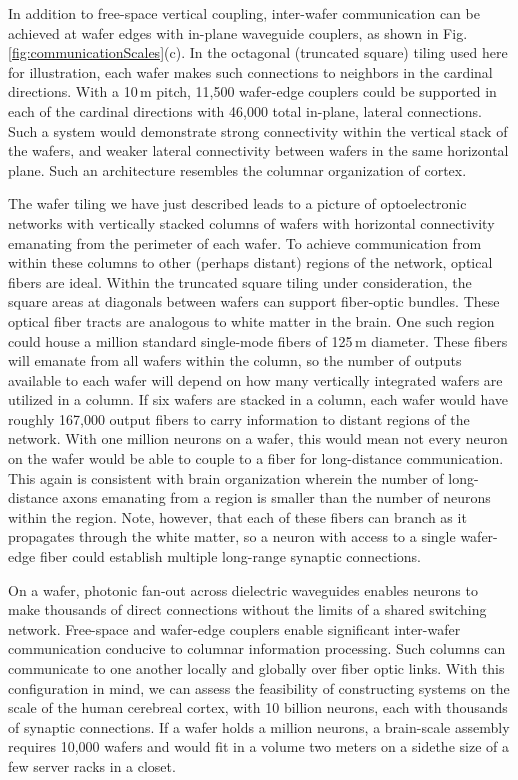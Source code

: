 \documentclass[twocolumn]{article}
\begin{document}
In addition to free-space vertical coupling, inter-wafer communication can be achieved at wafer edges with in-plane waveguide couplers, as shown in Fig.\,\ref{fig:communicationScales}(c). In the octagonal (truncated square) tiling used here for illustration, each wafer makes such connections to neighbors in the cardinal directions. With a 10\,\textmu m pitch, 11,500 wafer-edge couplers could be supported in each of the cardinal directions with 46,000 total in-plane, lateral connections. Such a system would demonstrate strong connectivity within the vertical stack of the wafers, and weaker lateral connectivity between wafers in the same horizontal plane. Such an architecture resembles the columnar organization of cortex.  

The wafer tiling we have just described leads to a picture of optoelectronic networks with vertically stacked columns of wafers with horizontal connectivity emanating from the perimeter of each wafer. To achieve communication from within these columns to other (perhaps distant) regions of the network, optical fibers are ideal. Within the truncated square tiling under consideration, the square areas at diagonals between wafers can support fiber-optic bundles. These optical fiber tracts are analogous to white matter in the brain. One such region could house a million standard single-mode fibers of 125\,\textmu m diameter. These fibers will emanate from all wafers within the column, so the number of outputs available to each wafer will depend on how many vertically integrated wafers are utilized in a column. If six wafers are stacked in a column, each wafer would have roughly 167,000 output fibers to carry information to distant regions of the network. With one million neurons on a wafer, this would mean not every neuron on the wafer would be able to couple to a fiber for long-distance communication. This again is consistent with brain organization wherein the number of long-distance axons emanating from a region is smaller than the number of neurons within the region. Note, however, that each of these fibers can branch as it propagates through the white matter, so a neuron with access to a single wafer-edge fiber could establish multiple long-range synaptic connections. 

On a wafer, photonic fan-out across dielectric waveguides enables neurons to make thousands of direct connections without the limits of a shared switching network. Free-space and wafer-edge couplers enable significant inter-wafer communication conducive to columnar information processing. Such columns can communicate to one another locally and globally over fiber optic links. With this configuration in mind, we can assess the feasibility of constructing systems on the scale of the human cerebreal cortex, with 10 billion neurons, each with thousands of synaptic connections. If a wafer holds a million neurons, a brain-scale assembly requires 10,000 wafers and would fit in a volume two meters on a side\textemdash the size of a few server racks in a closet. 
\end{document}
